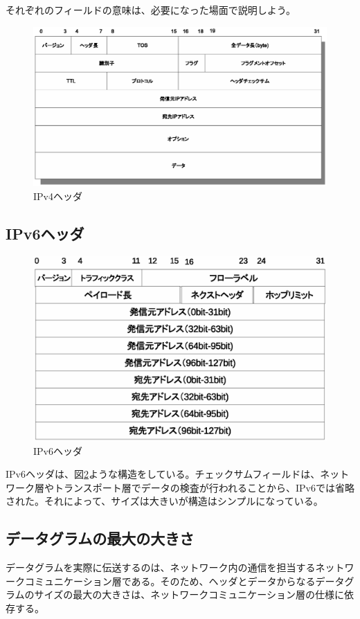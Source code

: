 それぞれのフィールドの意味は、必要になった場面で説明しよう。
\begin{figure}
	\includegraphics[width=14cm,clip]{draw/ipheader.eps}
	\caption{IPv4ヘッダ}
	\label{fig:ipheader}
\end{figure}

\subsection{IPv6ヘッダ}

\begin{figure}
	\includegraphics[width=14cm,clip]{draw/ipv6header.eps}
	\caption{IPv6ヘッダ}
	\label{fig:ipv6header}
\end{figure}

IPv6ヘッダは、図\ref{fig:ipv6header}ような構造をしている。チェックサムフィールドは、ネットワーク層やトランスポート層でデータの検査が行われることから、IPv6では省略された。それによって、サイズは大きいが構造はシンプルになっている。


\subsection{データグラムの最大の大きさ}
データグラムを実際に伝送するのは、ネットワーク内の通信を担当するネットワークコミュニケーション層である。そのため、ヘッダとデータからなるデータグラムのサイズの最大の大きさは、ネットワークコミュニケーション層の仕様に依存する。

